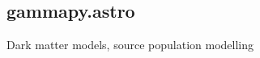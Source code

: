 \subsection{gammapy.astro}
\label{ssec:gammapy-astro}
Dark matter models, source population modelling
